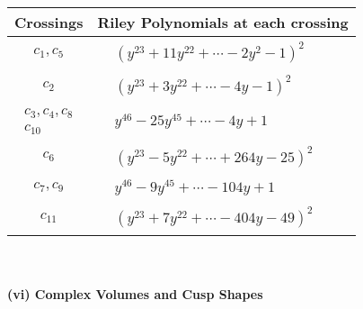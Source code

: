 \documentclass[1p]{elsarticle_modified}
\theoremstyle{definition}
\begin{document}
\begin{tabular}{m{50pt}|m{274pt}}
Crossings & \hspace{64pt}Riley Polynomials at each crossing \\
\hline $$\begin{aligned}c_{1},c_{5}\end{aligned}$$&$\begin{aligned}
&(y^{23}+11 y^{22}+\cdots-2 y^2-1)^{2}
\end{aligned}$\\
\hline $$\begin{aligned}c_{2}\end{aligned}$$&$\begin{aligned}
&(y^{23}+3 y^{22}+\cdots-4 y-1)^{2}
\end{aligned}$\\
\hline $$\begin{aligned}c_{3},c_{4},c_{8}\\c_{10}\end{aligned}$$&$\begin{aligned}
&y^{46}-25 y^{45}+\cdots-4 y+1
\end{aligned}$\\
\hline $$\begin{aligned}c_{6}\end{aligned}$$&$\begin{aligned}
&(y^{23}-5 y^{22}+\cdots+264 y-25)^{2}
\end{aligned}$\\
\hline $$\begin{aligned}c_{7},c_{9}\end{aligned}$$&$\begin{aligned}
&y^{46}-9 y^{45}+\cdots-104 y+1
\end{aligned}$\\
\hline $$\begin{aligned}c_{11}\end{aligned}$$&$\begin{aligned}
&(y^{23}+7 y^{22}+\cdots-404 y-49)^{2}
\end{aligned}$\\
\hline
\end{tabular}\\~\\
\newpage\flushleft \textbf{(vi) Complex Volumes and Cusp Shapes}
\end{document}
